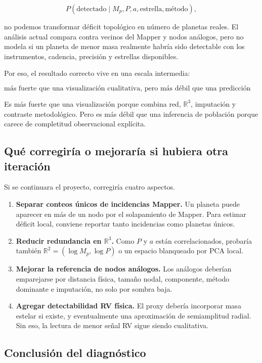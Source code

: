 \documentclass[11pt]{article}
\begin{document}
\[
P(\mathrm{detectado}\mid M_p,P,a,\text{estrella},\text{método}),
\]

no podemos transformar déficit topológico en número de planetas reales. El análisis actual compara contra vecinos del Mapper y nodos análogos, pero no modela si un planeta de menor masa realmente habría sido detectable con los instrumentos, cadencia, precisión y estrellas disponibles.

Por eso, el resultado correcto vive en una escala intermedia:

\[
\text{más fuerte que una visualización cualitativa, pero más débil que una predicción poblacional.}
\]

Es más fuerte que una visualización porque combina red, $\mathbb{R}^3$, imputación y contraste metodológico. Pero es más débil que una inferencia de población porque carece de completitud observacional explícita.

\subsection{Qué corregiría o mejoraría si hubiera otra iteración}

Si se continuara el proyecto, corregiría cuatro aspectos.

\begin{enumerate}
    \item \textbf{Separar conteos únicos de incidencias Mapper.} Un planeta puede aparecer en más de un nodo por el solapamiento de Mapper. Para estimar déficit local, conviene reportar tanto incidencias como planetas únicos.
    \item \textbf{Reducir redundancia en $\mathbb{R}^3$.} Como $P$ y $a$ están correlacionados, probaría también $\mathbb{R}^2=(\log M_p,\log P)$ o un espacio blanqueado por PCA local.
    \item \textbf{Mejorar la referencia de nodos análogos.} Los análogos deberían emparejarse por distancia física, tamaño nodal, componente, método dominante e imputación, no solo por sombra baja.
    \item \textbf{Agregar detectabilidad RV física.} El proxy debería incorporar masa estelar si existe, y eventualmente una aproximación de semiamplitud radial. Sin eso, la lectura de menor señal RV sigue siendo cualitativa.
\end{enumerate}

\subsection{Conclusión del diagnóstico}
\end{document}
